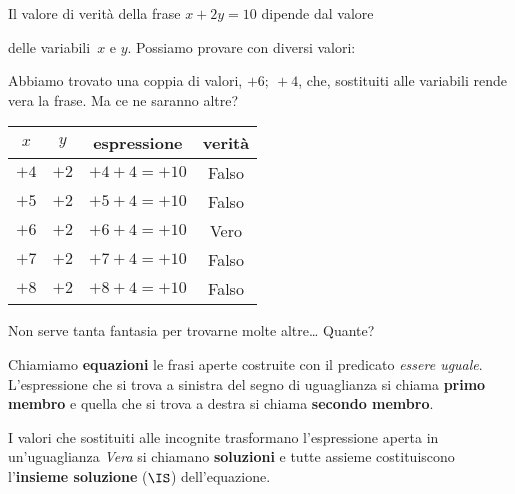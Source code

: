 \begin{esempio}{}{}
Il valore di verità della frase \(x + 2y = 10\) dipende dal valore 

{
delle variabili~\(x\) e \(y\). Possiamo provare con diversi valori: 

\vspace{.5em}
Abbiamo trovato una coppia di valori, \(+6;~ +4\), che, 
sostituiti alle variabili rende vera la frase.
Ma ce ne saranno altre?
}{
\begin{center}
\begin{tabular}{cccc}
\(x\) & \(y\) & espressione & verità\\
\hline
\(+4\) & \(+2\) & \(+4 +4 = +10\) & Falso\\
\(+5\) & \(+2\)& \(+5 +4 = +10\) & Falso\\
\(+6\) & \(+2\)& \(+6 +4 = +10\) & Vero\\
\(+7\) & \(+2\)& \(+7 +4 = +10\) & Falso\\
\(+8\) & \(+2\)& \(+8 +4 = +10\) & Falso\\
\end{tabular}
\end{center}
}

Non serve tanta fantasia per trovarne molte altre\dots
Quante?
\end{esempio}

% 


\begin{definizione}{}{}
    
Chiamiamo \textbf{equazioni} le frasi aperte costruite con il predicato 
\emph{essere uguale}. 
L'espressione che si trova a sinistra del segno di uguaglianza si chiama 
\textbf{primo membro} e quella che si trova a destra si chiama 
\textbf{secondo membro}.

I valori che sostituiti alle incognite trasformano l'espressione aperta 
in un'uguaglianza \emph{Vera} si chiamano \textbf{soluzioni} 
e tutte assieme costituiscono l'\textbf{insieme soluzione} (\(\IS\)) 
dell'equazione.
\end{definizione}

